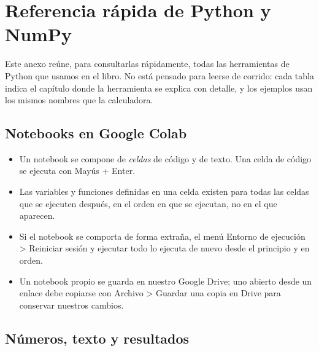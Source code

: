 \chapter{Referencia rápida de Python y NumPy}\label{cap:referencia_python}

Este anexo reúne, para consultarlas rápidamente, todas las herramientas de
Python que usamos en el libro. No está pensado para leerse de corrido: cada
tabla indica el capítulo donde la herramienta se explica con detalle, y los
ejemplos usan los mismos nombres que la calculadora.

\section{Notebooks en Google Colab}\label{sec:a_colab}

\begin{itemize}
  \item Un notebook se compone de \emph{celdas} de código y de texto. Una
    celda de código se ejecuta con \textsf{Mayús + Enter}.
  \item Las variables y funciones definidas en una celda existen para todas
    las celdas que se ejecuten después, en el orden en que se ejecutan, no en
    el que aparecen.
  \item Si el notebook se comporta de forma extraña, el menú
    \textsf{Entorno de ejecución > Reiniciar sesión y ejecutar todo} lo
    ejecuta de nuevo desde el principio y en orden.
  \item Un notebook propio se guarda en nuestro Google Drive; uno abierto
    desde un enlace debe copiarse con \textsf{Archivo > Guardar una copia en
    Drive} para conservar nuestros cambios.
\end{itemize}

\section{Números, texto y resultados}\label{sec:a_numeros}

